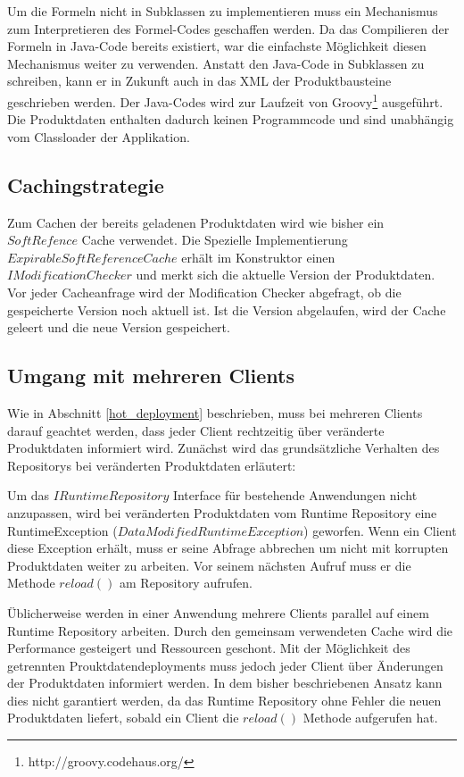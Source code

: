 \documentclass[headsepline=true, footsepline=true]{scrartcl}
\begin{document}
Um die Formeln nicht in Subklassen zu implementieren muss ein Mechanismus zum
Interpretieren des Formel-Codes geschaffen werden. Da das Compilieren der
Formeln in Java-Code bereits existiert, war die einfachste Möglichkeit diesen
Mechanismus weiter zu verwenden. Anstatt den Java-Code in Subklassen zu
schreiben, kann er in Zukunft auch in das XML der Produktbausteine geschrieben
werden. Der Java-Codes wird zur Laufzeit von
Groovy\footnote{http://groovy.codehaus.org/} ausgeführt. Die Produktdaten
enthalten dadurch keinen Programmcode und sind unabhängig vom Classloader der Applikation.

\subsection{Cachingstrategie}

Zum Cachen der bereits geladenen Produktdaten wird wie bisher ein $SoftRefence$
Cache verwendet. Die Spezielle Implementierung $ExpirableSoftReferenceCache$
erhält im Konstruktor einen $IModificationChecker$ und merkt sich die aktuelle
Version der Produktdaten. Vor jeder Cacheanfrage wird der
Modification Checker abgefragt, ob die gespeicherte Version noch aktuell ist.
Ist die Version abgelaufen, wird der Cache geleert und die neue Version
gespeichert.


\subsection{Umgang mit mehreren Clients}

Wie in Abschnitt \ref{hot_deployment} beschrieben, muss bei mehreren Clients
darauf geachtet werden, dass jeder Client rechtzeitig über veränderte
Produktdaten informiert wird. Zunächst wird das grundsätzliche
Verhalten des Repositorys bei veränderten Produktdaten erläutert:

Um das $IRuntimeRepository$ Interface für bestehende Anwendungen nicht
anzupassen, wird bei veränderten Produktdaten vom Runtime Repository eine
RuntimeException ($DataModifiedRuntimeException$) geworfen. Wenn ein Client diese
Exception erhält, muss er seine Abfrage abbrechen um nicht mit korrupten
Produktdaten weiter zu arbeiten. Vor seinem nächsten Aufruf muss er die Methode
$reload()$ am Repository aufrufen.

Üblicherweise werden in einer Anwendung mehrere Clients parallel auf einem
Runtime Repository arbeiten. Durch den gemeinsam verwendeten Cache wird die
Performance gesteigert und Ressourcen geschont. Mit der Möglichkeit des
getrennten Prouktdatendeployments muss jedoch jeder Client über Änderungen der
Produktdaten informiert werden. In dem bisher beschriebenen Ansatz kann dies
nicht garantiert werden, da das Runtime Repository ohne Fehler die neuen
Produktdaten liefert, sobald ein Client die $reload()$ Methode aufgerufen hat.
\end{document}
